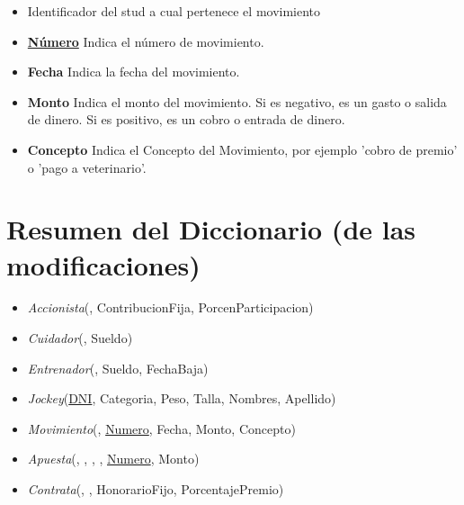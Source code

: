 \documentclass[a4paper,11pt]{article}
\begin{document}
\begin{itemize}

  \item \textbf{\uline{}} Identificador del stud a cual pertenece el movimiento

  \item \textbf{\uline{Número}} Indica el número de movimiento.

  \item \textbf{Fecha} Indica la fecha del movimiento.

  \item \textbf{Monto} Indica el monto del movimiento. Si es negativo, es un 
  gasto o salida de dinero. Si es positivo, es un cobro o entrada de dinero.

  \item \textbf{Concepto} Indica el Concepto del Movimiento, por ejemplo 
  'cobro de premio' o 'pago a veterinario'.
      
\end{itemize}


\section{Resumen del Diccionario (de las modificaciones)}

\begin{itemize}

  \item \emph{Accionista}(\uline{}, ContribucionFija, 
    PorcenParticipacion)

  \item \emph{Cuidador}(\uline{}, Sueldo)

  \item \emph{Entrenador}(\uline{}, Sueldo, FechaBaja)

  \item \emph{Jockey}(\uline{DNI}, Categoria, Peso, Talla, Nombres, Apellido)

  \item \emph{Movimiento}(\uline{}, \uline{Numero}, Fecha, Monto, Concepto)

  \item \emph{Apuesta}(\uline{}, \uline{}, \uline{}, 
  \uline{}, \uline{Numero}, Monto)
  
  \item \emph{Contrata}(\uline{}, \uline{}, HonorarioFijo, PorcentajePremio) 

\end{itemize}
\end{document}
